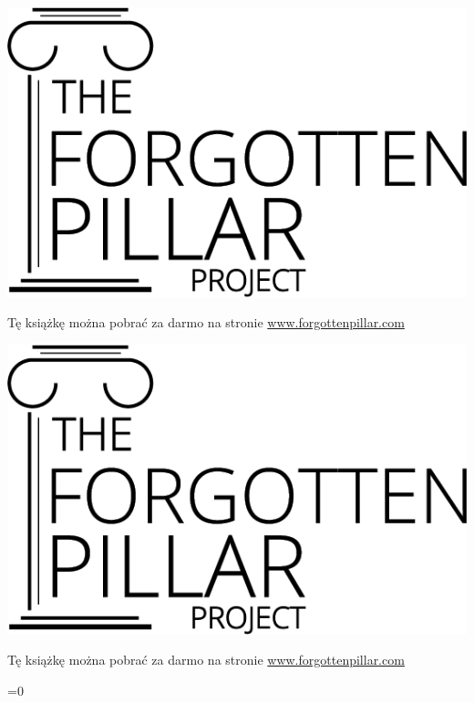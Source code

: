 {\vfill

{\licensesize \licensetext}

\ifepub
    \includegraphics[width=\linewidth]{images/logo-black.png}

    Tę książkę można pobrać za darmo na stronie \href{https://forgottenpillar.com/book/the-forgotten-pillar}{www.forgottenpillar.com}
\else
    \noindent
    \begin{minipage}{0.3\textwidth}
        \includegraphics[width=\linewidth]{images/logo-black.png}
    \end{minipage}%
    \hfill
    \begin{minipage}{\dimexpr\linewidth-0.3\textwidth-0.125\textwidth-1em\relax}
        \raggedleft\footnotesize
        Tę książkę można pobrać za darmo na stronie \href{https://forgottenpillar.com/book/the-forgotten-pillar?lang=\currentlang&type=\currentlayout}{www.forgottenpillar.com}
    \end{minipage}%
    \ifnum{}=0
    \else
        \hfill
        \begin{minipage}{0.125\textwidth}
            \centering
        \end{minipage}
    \fi%
\fi
}

\pagebreak